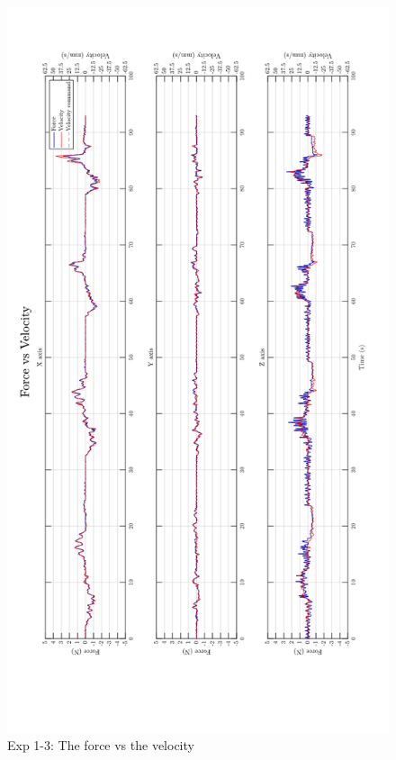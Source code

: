 \begin{figure}[htbp]
\begin{center}
\includegraphics[width=1\linewidth]{Images/exp/exp1_3_2.png}
\caption{Exp 1-3: The force vs the velocity}
\label{fig: exp1_3_2}
\end{center}
\end{figure}	
